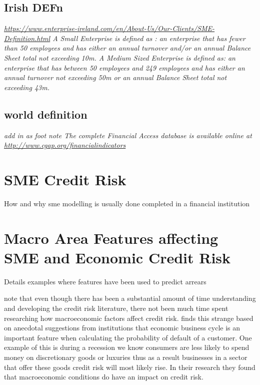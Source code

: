 \subsection{Irish DEFn}
\textit{\url{https://www.enterprise-ireland.com/en/About-Us/Our-Clients/SME-Definition.html}
	A Small Enterprise is defined as :
	an enterprise that has fewer than 50 employees and has either an annual turnover and/or an annual Balance Sheet total not exceeding 10m. A Medium Sized Enterprise is defined as: an enterprise that has between 50 employees and 249 employees and has either an annual turnover not exceeding 50m or an annual Balance Sheet total not exceeding 43m.}

\subsection{world definition}
 \textit{add in as foot note
 The complete 
 Financial Access
 database is available online at \url{http://www.cgap.org/financialindicators}
 } 


\section{SME Credit Risk}
How and why sme modelling is usually done completed in a financial institution



\section{Macro Area Features affecting SME and Economic Credit Risk}
Details examples where features have been used to predict arrears

\cite{hackbarth_capital_2006} note that even though there has been a substantial amount of time  understanding and developing the credit risk literature, there not been much time spent researching how macroeconomic factors affect credit risk.  \cite{hackbarth_capital_2006} finds this strange based on anecdotal suggestions from institutions that economic business cycle is an important feature when calculating the probability of default of a customer. One example of this is during a recession we know consumers are less likely to spend money on discretionary goods or luxuries thus as a result businesses in a sector that offer these goods credit risk will most likely rise. In their research they found that macroeconomic conditions do have an impact on credit risk.

